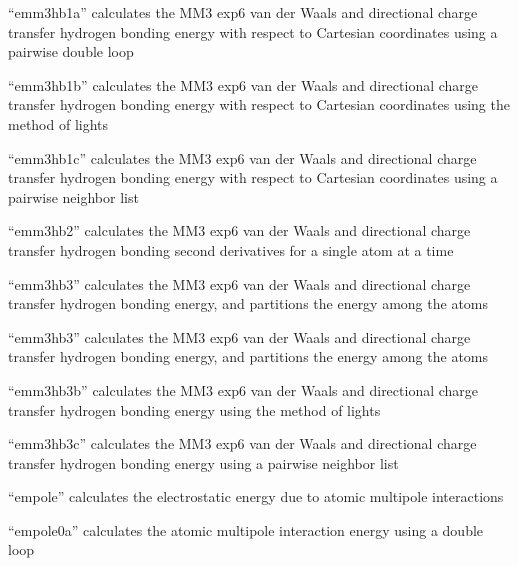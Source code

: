 \documentclass[letterpaper,11pt,english]{sphinxmanual}
\begin{document}

“emm3hb1a” calculates the MM3 exp\sphinxhyphen{}6 van der Waals and directional
charge transfer hydrogen bonding energy with respect to Cartesian
coordinates using a pairwise double loop


“emm3hb1b” calculates the MM3 exp\sphinxhyphen{}6 van der Waals and directional
charge transfer hydrogen bonding energy with respect to Cartesian
coordinates using the method of lights


“emm3hb1c” calculates the MM3 exp\sphinxhyphen{}6 van der Waals and directional
charge transfer hydrogen bonding energy with respect to Cartesian
coordinates using a pairwise neighbor list


“emm3hb2” calculates the MM3 exp\sphinxhyphen{}6 van der Waals and directional
charge transfer hydrogen bonding second derivatives for a single
atom at a time


“emm3hb3” calculates the MM3 exp\sphinxhyphen{}6 van der Waals and directional
charge transfer hydrogen bonding energy, and partitions the energy
among the atoms


“emm3hb3” calculates the MM3 exp\sphinxhyphen{}6 van der Waals and
directional charge transfer hydrogen bonding energy, and
partitions the energy among the atoms


“emm3hb3b” calculates the MM3 exp\sphinxhyphen{}6 van der Waals and
directional charge transfer hydrogen bonding energy using
the method of lights


“emm3hb3c” calculates the MM3 exp\sphinxhyphen{}6 van der Waals and
directional charge transfer hydrogen bonding energy using
a pairwise neighbor list


“empole” calculates the electrostatic energy due to atomic
multipole interactions


“empole0a” calculates the atomic multipole interaction energy
using a double loop
\end{document}
